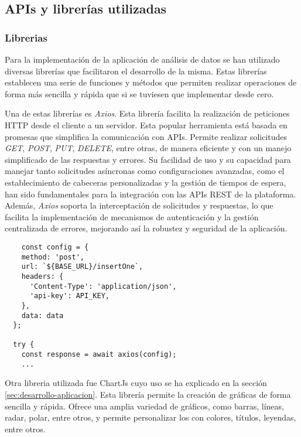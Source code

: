 \subsection{APIs y librerías utilizadas}
\label{sec:apis-librerias}

\subsubsection{Librerias}
\label{sec:librerias}

Para la implementación de la aplicación de análisis de datos se han utilizado diversas librerías que facilitaron el desarrollo de la misma.
Estas librerías establecen una serie de funciones y métodos que permiten realizar operaciones de forma más sencilla y rápida que si se
tuviesen que implementar desde cero. 

Una de estas librerías es \textit{Axios}. Esta librería facilita la realización de peticiones HTTP desde el cliente a un servidor.
Esta popular herramienta está basada en promesas que simplifica la comunicación con APIs. Permite realizar solicitudes \textit{GET},
\textit{POST}, \textit{PUT}, \textit{DELETE}, entre otras, de manera eficiente y con un manejo simplificado de las respuestas y errores.
Su facilidad de uso y su capacidad para manejar tanto solicitudes asíncronas como configuraciones avanzadas, como el establecimiento 
de cabeceras personalizadas y la gestión de tiempos de espera, han sido fundamentales para la integración con las APIs REST de la 
plataforma. Además, \textit{Axios} soporta la interceptación de solicitudes y respuestas, lo que facilita la implementación de
mecanismos de autenticación y la gestión centralizada de errores, mejorando así la robustez y seguridad de la aplicación.

\begin{verbatim}
    const config = {
    method: 'post',
    url: `${BASE_URL}/insertOne`,
    headers: {
      'Content-Type': 'application/json',
      'api-key': API_KEY,
    },
    data: data
  };

  try {
    const response = await axios(config);
    ...

\end{verbatim}

Otra libreria utilizada fue ChartJs cuyo uso se ha explicado en la sección \ref{sec:desarrollo-aplicacion}. Esta librería permite la
 creación de gráficas de forma sencilla y rápida. Ofrece una amplia variedad de gráficos, como barras, líneas, radar, polar,
entre otros, y permite personalizar los con colores, títulos, leyendas, entre otros.

